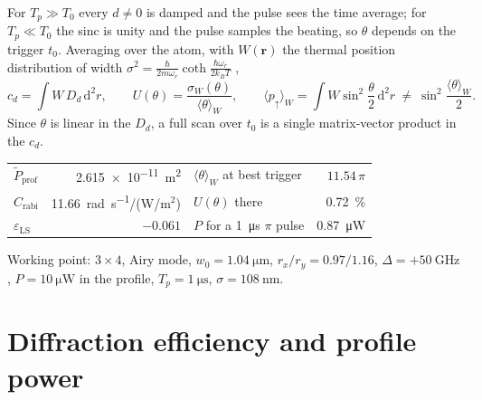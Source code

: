 For $T_p\gg T_0$ every $d\neq0$ is damped and the pulse sees the time average;
for $T_p\ll T_0$ the sinc is unity and the pulse samples the beating, so
$\theta$ depends on the trigger $t_0$. Averaging over the atom, with
$W(\mathbf{r})$ the thermal position distribution of width
$\sigma^2=\frac{\hbar}{2m\omega_r}\coth\frac{\hbar\omega_r}{2k_BT}$
\cite{Tuchendler2008},
\begin{equation}
c_d=\int W\,D_d\,\mathrm{d}^2r,
\qquad
U(\theta)=\frac{\sigma_W(\theta)}{\langle\theta\rangle_W},
\qquad
\langle p_\uparrow\rangle_W=\int W\sin^2\frac{\theta}{2}\,\mathrm{d}^2r
\ \neq\ \sin^2\frac{\langle\theta\rangle_W}{2} .
\label{eq:app_atom}
\end{equation}
Since $\theta$ is linear in the $D_d$, a full scan over $t_0$ is a single
matrix-vector product in the $c_d$.

\begin{center}
\begin{tabular}{lr@{\qquad}lr}
\hline
$\tilde P_\mathrm{prof}$ & \SI{2.615e-11}{\metre\squared}
 & $\langle\theta\rangle_W$ at best trigger & $11.54\,\pi$\\
$C_\mathrm{rabi}$ & \SI{11.66}{\radian\per\second}/(W/m$^2$)
 & $U(\theta)$ there & \SI{0.72}{\percent}\\
$\varepsilon_\mathrm{LS}$ & $-0.061$
 & $P$ for a \SI{1}{\micro \second} $\pi$ pulse & \SI{0.87}{\micro \watt}\\
\hline
\end{tabular}
\end{center}

\noindent Working point: $3\times4$, Airy mode, $w_0=\SI{1.04}{\micro \metre}$,
$r_x/r_y=0.97/1.16$, $\Delta=+\SI{50}{\giga \hertz}$,
$P=\SI{10}{\micro \watt}$ in the profile, $T_p=\SI{1}{\micro \second}$,
$\sigma=\SI{108}{\nano \metre}$.

\section{Diffraction efficiency and profile power}
\label{app:eta}

